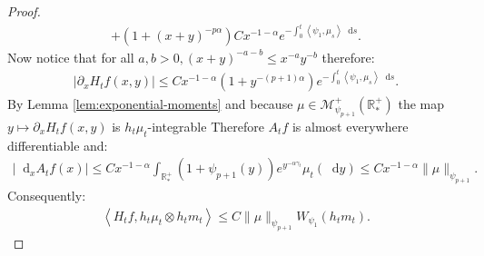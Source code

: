 \documentclass[11pt,a4paper]{article}
\newcommand{\RRP}{\mathbb{R}^+_*}
\newcommand{\MC}{\mathcal{M}}
\newcommand{\brac}[1]{\left\langle#1\right\rangle}
\newcommand{\dd}{\mathop{}\!\mathrm{d}}
\begin{document}
\begin{proof}
\begin{multline*}
        +  \left( 1 + (x+y)^{-p\alpha} \right)C x^{-1-\alpha}e^{-\int_0^t \brac{\psi_1,\mu_s}\dd s}.
    \end{multline*}
    Now notice that for all $a,b > 0, (x+y)^{-a - b} \leq x^{-a}y^{-b}$ therefore:
    \begin{align*}
        \left|\partial_x H_tf(x,y) \right| \leq C x^{-1-\alpha} (1 + y^{-(p+1)\alpha})e^{-\int_0^t \brac{\psi_1,\mu_s}\dd s}.
    \end{align*}
    By Lemma \ref{lem:exponential-moments} and because $\mu \in \MC^+_{\psi_{p+1}}(\RRP)$ the map $y \mapsto \partial_x H_tf(x,y)$ is $h_t \mu_t$-integrable Therefore $A_tf$ is almost everywhere differentiable and: 
    \begin{align*}
        \left|\dd_x A_tf(x) \right| \leq  C x^{-1-\alpha}\int_{\RRP} (1 + \psi_{p+1}(y)) e^{y^{-\alpha \gamma_t }}\mu_t(\dd y) \leq C x^{-1-\alpha}\| \mu\|_{\psi_{p+1}}.
    \end{align*}
    Consequently:
    \begin{align*}
        \brac{H_tf,h_t\mu_t \otimes h_t m_t} \leq C\|\mu\|_{\psi_{p+1}} W_{\psi_1}(h_tm_t).
    \end{align*} 


\end{proof}
\end{document}
